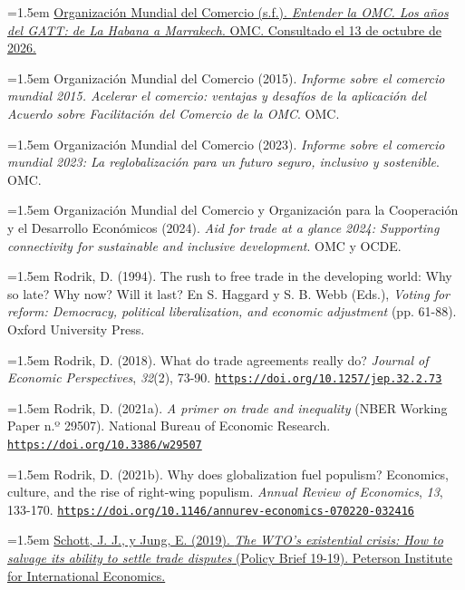 \documentclass[10pt,a4paper]{article}
\begin{document}
\noindent\hangindent=1.5em \href{https://www.wto.org/spanish/thewto_s/whatis_s/tif_s/fact4_s.htm}{Organización Mundial del Comercio (s.f.). \textit{Entender la OMC. Los años del GATT: de La Habana a Marrakech}. OMC. Consultado el 13 de octubre de 2026.}

\noindent\hangindent=1.5em Organización Mundial del Comercio (2015). \textit{Informe sobre el comercio mundial 2015. Acelerar el comercio: ventajas y desafíos de la aplicación del Acuerdo sobre Facilitación del Comercio de la OMC}. OMC.

\noindent\hangindent=1.5em Organización Mundial del Comercio (2023). \textit{Informe sobre el comercio mundial 2023: La reglobalización para un futuro seguro, inclusivo y sostenible}. OMC.

\noindent\hangindent=1.5em Organización Mundial del Comercio y Organización para la Cooperación y el Desarrollo Económicos (2024). \textit{Aid for trade at a glance 2024: Supporting connectivity for sustainable and inclusive development}. OMC y OCDE.

\noindent\hangindent=1.5em Rodrik, D. (1994). The rush to free trade in the developing world: Why so late? Why now? Will it last? En S. Haggard y S. B. Webb (Eds.), \textit{Voting for reform: Democracy, political liberalization, and economic adjustment} (pp. 61-88). Oxford University Press.

\noindent\hangindent=1.5em Rodrik, D. (2018). What do trade agreements really do? \textit{Journal of Economic Perspectives}, \textit{32}(2), 73-90. \href{https://doi.org/10.1257/jep.32.2.73}{\nolinkurl{https://doi.org/10.1257/jep.32.2.73}}

\noindent\hangindent=1.5em Rodrik, D. (2021a). \textit{A primer on trade and inequality} (NBER Working Paper n.º 29507). National Bureau of Economic Research. \href{https://doi.org/10.3386/w29507}{\nolinkurl{https://doi.org/10.3386/w29507}}

\noindent\hangindent=1.5em Rodrik, D. (2021b). Why does globalization fuel populism? Economics, culture, and the rise of right-wing populism. \textit{Annual Review of Economics}, \textit{13}, 133-170. \href{https://doi.org/10.1146/annurev-economics-070220-032416}{\nolinkurl{https://doi.org/10.1146/annurev-economics-070220-032416}}

\noindent\hangindent=1.5em \href{https://www.piie.com/sites/default/files/documents/pb19-19.pdf}{Schott, J. J., y Jung, E. (2019). \textit{The WTO's existential crisis: How to salvage its ability to settle trade disputes} (Policy Brief 19-19). Peterson Institute for International Economics.}
\end{document}
